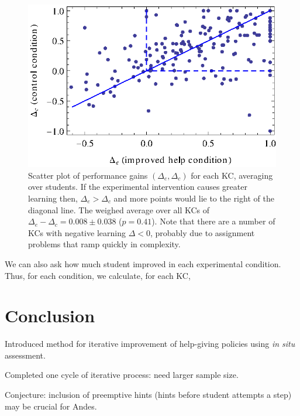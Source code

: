 \documentclass{edm_template}
\begin{document}
\begin{figure}
   \centering\includegraphics{scatter-gain.eps}
   \caption{Scatter plot of performance gains $\left(\Delta_e,\Delta_c\right)$
   for each KC, averaging over students.  If the experimental intervention
   causes greater learning then, $\Delta_e > \Delta_c$ and more points
   would lie to the right of the diagonal line.
   The weighed average over all KCs of $\Delta_e - \Delta_c = 
        0.008\pm 0.038$ ($p=0.41$).
   Note that there are a number
   of KCs with negative learning $\Delta<0$, probably due to 
   assignment problems that ramp quickly in complexity. 
   }\label{scattergain}
\end{figure}

We can also ask how much student improved in each experimental condition.
Thus, for each condition, we calculate, for each KC, 

\section{Conclusion}

Introduced method for iterative improvement of help-giving policies using 
{\em in situ} assessment.

Completed one cycle of iterative process:  need larger sample size.

Conjecture: inclusion of preemptive hints (hints before student attempts
a step) may be crucial for Andes. 



\end{document}
